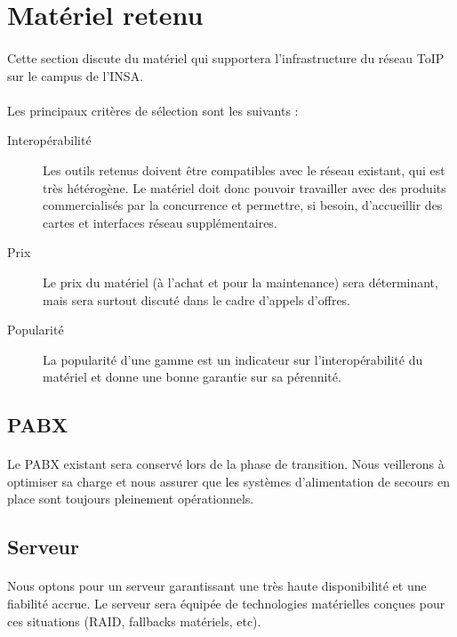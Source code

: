 \section{Matériel retenu}

\paragraph{} Cette section discute du matériel qui supportera l'infrastructure
du réseau ToIP sur le campus de l'INSA.

\paragraph{} Les principaux critères de sélection sont les suivants :
\begin{description}
	\item[Interopérabilité] Les outils retenus doivent être compatibles avec le
	réseau existant, qui est très hétérogène. Le matériel doit donc pouvoir
	travailler avec des produits commercialisés par la concurrence et permettre,
	si besoin, d'accueillir des cartes et interfaces réseau supplémentaires.
	\item[Prix] Le prix du matériel (à l'achat et pour la maintenance) sera
  déterminant, mais sera surtout discuté dans le cadre d'appels d'offres.
	\item[Popularité] La popularité d'une gamme est un indicateur sur
  l'interopérabilité du matériel et donne une bonne garantie sur sa pérennité.
\end{description}

\subsection{PABX}

\paragraph{} Le \ac{PABX} existant sera conservé lors de la phase de transition.
Nous veillerons à optimiser sa charge et nous assurer que les systèmes
d'alimentation de secours en place sont toujours pleinement opérationnels.

\subsection{Serveur}

\paragraph{} Nous optons pour un serveur garantissant une très haute
disponibilité et une fiabilité accrue. Le serveur sera équipée de technologies
matérielles conçues pour ces situations (RAID, fallbacks matériels, etc).

